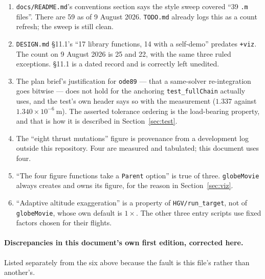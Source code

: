 \documentclass[11pt]{article}
\newcommand{\code}[1]{\texttt{#1}}
\newcommand{\pkg}[1]{\texttt{+#1}}
\begin{document}
\begin{enumerate}
\item \code{docs/README.md}'s conventions section says the style sweep covered
``39 \code{.m} files''. There are 59 as of 9 August 2026. \code{TODO.md}
already logs this as a count refresh; the sweep is still clean.
\item \code{DESIGN.md} \S11.1's ``17 library functions, 14 with a self-demo''
predates \pkg{viz}. The count on 9 August 2026 is 25 and 22, with the same
three ruled exceptions. \S11.1 is a dated record and is correctly left
unedited.
\item The plan brief's justification for \code{ode89} --- that a same-solver
re-integration goes bitwise --- does not hold for the anchoring
\code{test\_fullChain} actually uses, and the test's own header says so with
the measurement ($1.337$ against $1.340\times10^{-6}~\mathrm{m}$). The asserted
tolerance ordering is the load-bearing property, and that is how it is
described in Section~\ref{sec:test}.
\item The ``eight thrust mutations'' figure is provenance from a development
log outside this repository. Four are measured and tabulated; this document
uses four.
\item ``The four figure functions take a \code{Parent} option'' is true of
three. \code{globeMovie} always creates and owns its figure, for the reason in
Section~\ref{sec:viz}.
\item ``Adaptive altitude exaggeration'' is a property of
\code{HGV/run\_target}, not of \code{globeMovie}, whose own default is
$1\times$. The other three entry scripts use fixed factors chosen for their
flights.
\end{enumerate}

\paragraph{Discrepancies in this document's own first edition, corrected here.}
Listed separately from the six above because the fault is this file's rather
than another's.
\end{document}
